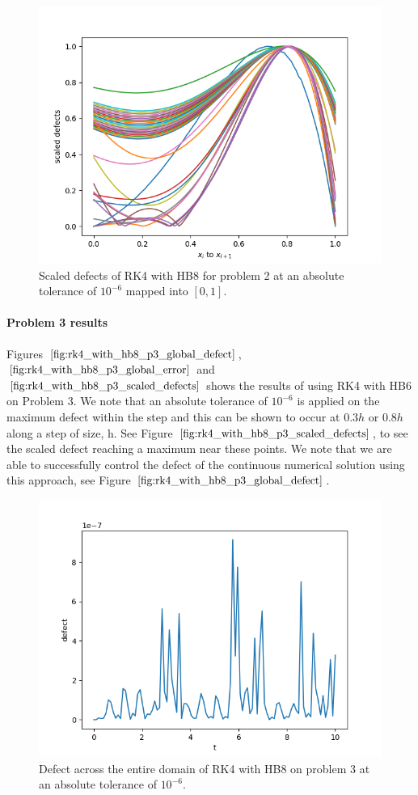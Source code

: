 \begin{figure}[H]
\centering
\includegraphics[width=0.7\linewidth]{./figures/rk4_with_hb8_p2_scaled_defects}
\caption{Scaled defects of RK4 with HB8 for problem 2 at an absolute tolerance of $10^{-6}$ mapped into $[0, 1]$.}
\label{fig:rk4_with_hb8_p2_scaled_defects}
\end{figure}

\paragraph{Problem 3 results}
Figures $\ref{fig:rk4_with_hb8_p3_global_defect}$, $\ref{fig:rk4_with_hb8_p3_global_error}$ and $\ref{fig:rk4_with_hb8_p3_scaled_defects}$ shows the results of using RK4 with HB6 on Problem 3. 
We note that an absolute tolerance of $10^{-6}$ is applied on the maximum defect within the step and this can be shown to occur at $0.3h$ or $0.8h$ along a step of size, h.  See Figure $\ref{fig:rk4_with_hb8_p3_scaled_defects}$, to see the scaled defect reaching a maximum near these points. We note that we are able to successfully control the defect of the continuous numerical solution using this approach, see Figure $\ref{fig:rk4_with_hb8_p3_global_defect}$. 

\begin{figure}[H]
\centering
\includegraphics[width=0.7\linewidth]{./figures/rk4_with_hb8_p3_global_defect}
\caption{Defect across the entire domain of RK4 with HB8 on problem 3 at an absolute tolerance of $10^{-6}$.}
\label{fig:rk4_with_hb8_p3_global_defect}
\end{figure}

